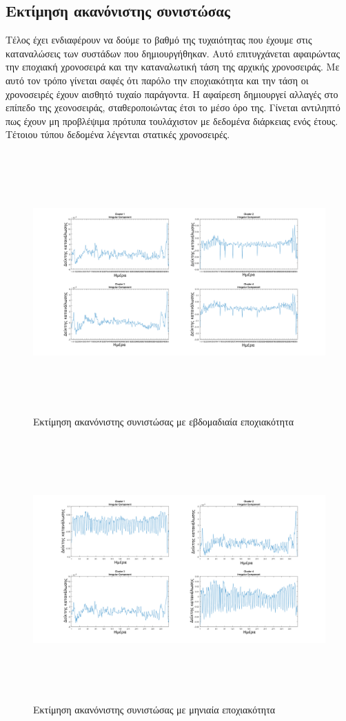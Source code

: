 \subsection{Εκτίμηση ακανόνιστης συνιστώσας}
Τέλος έχει ενδιαφέρουν να δούμε το βαθμό της τυχαιότητας που έχουμε στις καταναλώσεις των συστάδων που δημιουργήθηκαν. Αυτό επιτυγχάνεται αφαιρώντας την εποχιακή χρονοσειρά και την καταναλωτική τάση της αρχικής χρονοσειράς. Με αυτό τον τρόπο γίνεται σαφές ότι παρόλο την εποχιακότητα και την τάση οι χρονοσειρές έχουν αισθητό τυχαίο παράγοντα. Η αφαίρεση δημιουργεί αλλαγές στο επίπεδο της χεονοσειράς, σταθεροποιώντας έτσι το μέσο όρο της. Γίνεται αντιληπτό πως έχουν μη προβλέψιμα πρότυπα  τουλάχιστον με δεδομένα διάρκειας ενός έτους. Τέτοιου τύπου δεδομένα λέγενται στατικές χρονοσειρές.\cite{stationarity}
\begin{figure}[ht!]
\centering
\includegraphics[width=180mm, height=100mm]{../../plots/Trend_estimation/Irregular_component_ALL.png}
\caption{Εκτίμηση ακανόνιστης συνιστώσας με εβδομαδιαία εποχιακότητα}
\label{fig:irregular week}
\end{figure}

\newpage
\begin{figure}[ht!]
\centering
\includegraphics[width=180mm, height=100mm]{../../plots/Trend_estimation/Irregular_component_month_ALL.png}
\caption{Εκτίμηση ακανόνιστης συνιστώσας με μηνιαία εποχιακότητα}
\label{fig:irregular month}
\end{figure}
